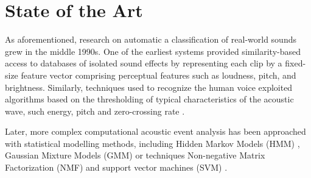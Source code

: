\section{State of the Art}

As aforementioned, research on automatic a classification of real-world sounds grew in the middle 1990s.
One of the earliest systems \cite{wold1996content} provided similarity-based access to databases of isolated sound effects by
representing each clip by a fixed-size feature vector comprising perceptual features
such as loudness, pitch, and brightness.
Similarly, techniques used to recognize the human voice exploited algorithms based on the thresholding of typical characteristics of the acoustic wave, such energy, pitch and zero-crossing rate \cite{woo2000robust}.

Later, more complex computational acoustic event analysis has been approached with statistical modelling methods, including Hidden Markov Models (HMM) \cite{degara2011onset}, Gaussian Mixture Models (GMM) \cite{heittola2010audio} or techniques Non-negative Matrix Factorization (NMF) \cite{carabias2011musical} and support vector machines (SVM) \cite{guo2003content}. 

